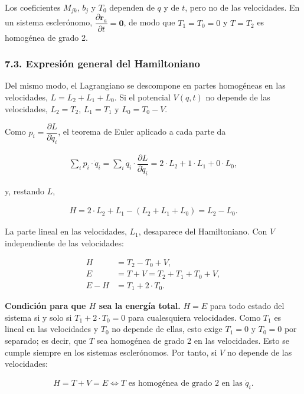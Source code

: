 \documentclass[
  spanish,
]{article}
\begin{document}
Los coeficientes \(M_{jk}\), \(b_j\) y \(T_0\) dependen de \(q\) y de
\(t\), pero no de las velocidades. En un sistema esclerónomo,
\(\dfrac{\partial \mathbf{r}_a}{\partial t} = \mathbf{0}\), de modo que
\(T_1 = T_0 = 0\) y \(T = T_2\) es homogénea de grado 2.

\subsubsection{7.3. Expresión general del
Hamiltoniano}\label{expresiuxf3n-general-del-hamiltoniano}

Del mismo modo, el Lagrangiano se descompone en partes homogéneas en las
velocidades, \(L = L_2 + L_1 + L_0\). Si el potencial \(V(q,t)\) no
depende de las velocidades, \(L_2 = T_2\), \(L_1 = T_1\) y
\(L_0 = T_0 - V\).

Como \(p_i = \dfrac{\partial L}{\partial \dot{q}_i}\), el teorema de
Euler aplicado a cada parte da

\[
\begin{aligned}
\sum_i p_i \cdot \dot{q}_i = \sum_i \dot{q}_i \cdot \dfrac{\partial L}{\partial \dot{q}_i} = 2 \cdot L_2 + 1 \cdot L_1 + 0 \cdot L_0,
\end{aligned}
\]

y, restando \(L\),

\[
\begin{aligned}
H = 2 \cdot L_2 + L_1 - (L_2 + L_1 + L_0) = L_2 - L_0.
\end{aligned}
\]

La parte lineal en las velocidades, \(L_1\), desaparece del
Hamiltoniano. Con \(V\) independiente de las velocidades:

\[
\begin{aligned}
H &= T_2 - T_0 + V, \\
E &= T + V = T_2 + T_1 + T_0 + V, \\
E - H &= T_1 + 2 \cdot T_0.
\end{aligned}
\]

\textbf{Condición para que \(H\) sea la energía total.} \(H = E\) para
todo estado del sistema si y solo si \(T_1 + 2 \cdot T_0 = 0\) para
cualesquiera velocidades. Como \(T_1\) es lineal en las velocidades y
\(T_0\) no depende de ellas, esto exige \(T_1 = 0\) y \(T_0 = 0\) por
separado; es decir, que \(T\) sea homogénea de grado 2 en las
velocidades. Esto se cumple siempre en los sistemas esclerónomos. Por
tanto, si \(V\) no depende de las velocidades:

\[
\begin{aligned}
H = T + V = E \iff T \text{ es homogénea de grado 2 en las } \dot{q}_i.
\end{aligned}
\]
\end{document}
